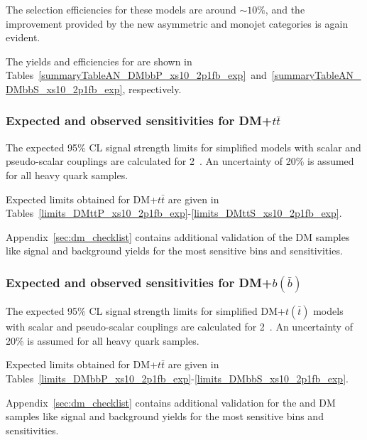 The selection efficiencies for these models are around $\sim 10$\%, and the improvement
provided by the new asymmetric and monojet categories is again evident.

\clearpage 
%
% 
\clearpage


The yields and efficiencies for \DMbb are shown in Tables~\ref{summaryTableAN_DMbbP_xs10_2p1fb_exp}~and~\ref{summaryTableAN_DMbbS_xs10_2p1fb_exp}, respectively. 

%
% 
\clearpage


\subsubsection{Expected and observed sensitivities for DM+$t\bar{t}$}

The expected 95\% CL signal strength limits for simplified \DMtt models with scalar and
pseudo-scalar couplings are calculated for 2~\ifb. An uncertainty of 20\% is assumed for all 
heavy quark samples.



\clearpage
Expected limits obtained for DM+$t\bar{t}$ are given in Tables~\ref{limits_DMttP_xs10_2p1fb_exp}-\ref{limits_DMttS_xs10_2p1fb_exp}.
%
%



Appendix~\ref{sec:dm_checklist} contains additional validation of the \DMj DM samples like signal and background yields for the most sensitive bins and sensitivities.

\subsubsection{Expected and observed sensitivities for DM+$b(\bar{b})$}

The expected 95\% CL signal strength limits for simplified DM+$t(\bar{t})$ models with scalar and
pseudo-scalar couplings are calculated for 2~\ifb. An uncertainty of 20\% is assumed for all 
heavy quark samples.


\clearpage
Expected limits obtained for DM+$t\bar{t}$ are given in Tables~\ref{limits_DMbbP_xs10_2p1fb_exp}-\ref{limits_DMbbS_xs10_2p1fb_exp}. 

%
%



Appendix~\ref{sec:dm_checklist} contains additional validation for the \DMtt and \DMtt DM samples like signal and background yields for the most sensitive bins and sensitivities.

